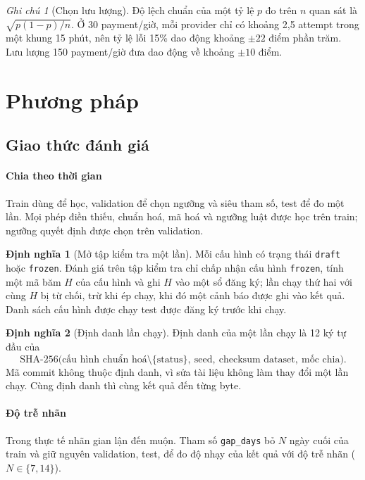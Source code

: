 \documentclass[11pt,a4paper]{article}
\theoremstyle{definition}
\newtheorem{definition}{Định nghĩa}
\theoremstyle{remark}
\newtheorem{remark}{Ghi chú}
\newcommand{\code}[1]{\texttt{#1}}
\numberwithin{equation}{section}
\begin{document}
\begin{remark}[Chọn lưu lượng]
Độ lệch chuẩn của một tỷ lệ $p$ đo trên $n$ quan sát là $\sqrt{p(1-p)/n}$. Ở 30 payment/giờ, mỗi provider chỉ có khoảng 2,5 attempt trong một khung 15 phút, nên tỷ lệ lỗi 15\% dao động khoảng $\pm 22$ điểm phần trăm. Lưu lượng 150 payment/giờ đưa dao động về khoảng $\pm 10$ điểm.
\end{remark}

\section{Phương pháp}
\subsection{Giao thức đánh giá}\label{sec:protocol}
\paragraph{Chia theo thời gian} Train dùng để học, validation để chọn ngưỡng và siêu tham số, test để đo một lần. Mọi phép điền thiếu, chuẩn hoá, mã hoá và ngưỡng luật được học trên train; ngưỡng quyết định được chọn trên validation.

\begin{definition}[Mở tập kiểm tra một lần]
Mỗi cấu hình có trạng thái \code{draft} hoặc \code{frozen}. Đánh giá trên tập kiểm tra chỉ chấp nhận cấu hình \code{frozen}, tính một mã băm $H$ của cấu hình và ghi $H$ vào một sổ đăng ký; lần chạy thứ hai với cùng $H$ bị từ chối, trừ khi ép chạy, khi đó một cảnh báo được ghi vào kết quả. Danh sách cấu hình được chạy test được đăng ký trước khi chạy.
\end{definition}

\begin{definition}[Định danh lần chạy]
Định danh của một lần chạy là 12 ký tự đầu của
\begin{equation}
\text{SHA-256}\bigl(\text{cấu hình chuẩn hoá}\setminus\{\text{status}\},\ \text{seed},\ \text{checksum dataset},\ \text{mốc chia}\bigr).
\end{equation} Mã commit không thuộc định danh, vì sửa tài liệu không làm thay đổi một lần chạy. Cùng định danh thì cùng kết quả đến từng byte.
\end{definition}

\paragraph{Độ trễ nhãn} Trong thực tế nhãn gian lận đến muộn. Tham số \code{gap\_days} bỏ $N$ ngày cuối của train và giữ nguyên validation, test, để đo độ nhạy của kết quả với độ trễ nhãn ($N\in\{7,14\}$).
\end{document}
